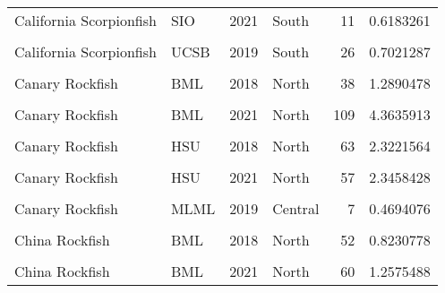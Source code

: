 \documentclass[
]{article}
\begin{document}
\begin{longtable}[t]{llrlrr}
California Scorpionfish & SIO & 2021 & South & 11 & 0.6183261\\
\cellcolor{gray!6}{California Scorpionfish} & \cellcolor{gray!6}{UCSB} & \cellcolor{gray!6}{2018} & \cellcolor{gray!6}{South} & \cellcolor{gray!6}{12} & \cellcolor{gray!6}{0.7295500}\\
\addlinespace
California Scorpionfish & UCSB & 2019 & South & 26 & 0.7021287\\
\cellcolor{gray!6}{California Scorpionfish} & \cellcolor{gray!6}{UCSB} & \cellcolor{gray!6}{2021} & \cellcolor{gray!6}{South} & \cellcolor{gray!6}{32} & \cellcolor{gray!6}{0.5678728}\\
Canary Rockfish & BML & 2018 & North & 38 & 1.2890478\\
\cellcolor{gray!6}{Canary Rockfish} & \cellcolor{gray!6}{BML} & \cellcolor{gray!6}{2019} & \cellcolor{gray!6}{North} & \cellcolor{gray!6}{57} & \cellcolor{gray!6}{1.5591921}\\
Canary Rockfish & BML & 2021 & North & 109 & 4.3635913\\
\addlinespace
\cellcolor{gray!6}{Canary Rockfish} & \cellcolor{gray!6}{Cal Poly} & \cellcolor{gray!6}{2018} & \cellcolor{gray!6}{Central} & \cellcolor{gray!6}{2} & \cellcolor{gray!6}{0.6550218}\\
Canary Rockfish & HSU & 2018 & North & 63 & 2.3221564\\
\cellcolor{gray!6}{Canary Rockfish} & \cellcolor{gray!6}{HSU} & \cellcolor{gray!6}{2019} & \cellcolor{gray!6}{North} & \cellcolor{gray!6}{62} & \cellcolor{gray!6}{2.4968405}\\
Canary Rockfish & HSU & 2021 & North & 57 & 2.3458428\\
\cellcolor{gray!6}{Canary Rockfish} & \cellcolor{gray!6}{MLML} & \cellcolor{gray!6}{2018} & \cellcolor{gray!6}{Central} & \cellcolor{gray!6}{3} & \cellcolor{gray!6}{0.6416667}\\
\addlinespace
Canary Rockfish & MLML & 2019 & Central & 7 & 0.4694076\\
\cellcolor{gray!6}{Canary Rockfish} & \cellcolor{gray!6}{MLML} & \cellcolor{gray!6}{2021} & \cellcolor{gray!6}{Central} & \cellcolor{gray!6}{6} & \cellcolor{gray!6}{1.1709987}\\
China Rockfish & BML & 2018 & North & 52 & 0.8230778\\
\cellcolor{gray!6}{China Rockfish} & \cellcolor{gray!6}{BML} & \cellcolor{gray!6}{2019} & \cellcolor{gray!6}{North} & \cellcolor{gray!6}{68} & \cellcolor{gray!6}{0.7586641}\\
China Rockfish & BML & 2021 & North & 60 & 1.2575488\\

\end{longtable}
\end{document}
